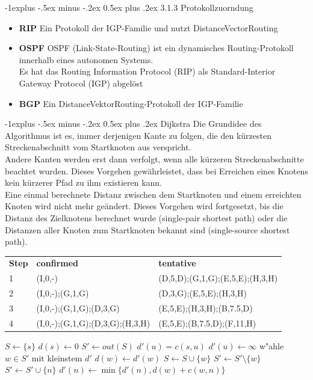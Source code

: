 \documentclass[10pt,landscape]{article}
\makeatletter
\renewcommand{\subsection}{\@startsection{subsection}{2}{0mm}%
                                {-1explus -.5ex minus -.2ex}%
                                {0.5ex plus .2ex}%
                                {\normalfont\normalsize\bfseries}}
\makeatother
\begin{document}
\begin{multicols}{3}
\subsection{3.1.3 Protokollzuorndung}
\begin{itemize}
    \item \textbf{RIP} Ein Protokoll der IGP-Familie und nutzt DistanceVectorRouting
    \item \textbf{OSPF} OSPF (Link-State-Routing) ist ein dynamisches Routing-Protokoll innerhalb eines autonomen Systems. \\
        Es hat das Routing Information Protocol (RIP) als Standard-Interior Gateway Protocol (IGP) abgel\"ost
    \item \textbf{BGP} Ein DistanceVektorRouting-Protokoll der IGP-Familie 
\end{itemize}


\subsection{Dijkstra}
Die Grundidee des Algorithmus ist es, immer derjenigen Kante zu folgen,
die den k\"urzesten Streckenabschnitt vom Startknoten aus verspricht. \\
Andere Kanten werden erst dann verfolgt, wenn alle k\"urzeren Streckenabschnitte beachtet wurden.
Dieses Vorgehen gew\"ahrleistet, dass bei Erreichen eines Knotens kein k\"urzerer Pfad zu ihm existieren kann. \\
Eine einmal berechnete Distanz zwischen dem Startknoten und einem erreichten Knoten wird nicht mehr ge\"andert.
Dieses Vorgehen wird fortgesetzt, bis die Distanz des Zielknotens berechnet wurde (single-pair shortest path)
oder die Distanzen aller Knoten zum Startknoten bekannt sind (single-source shortest path).
\tiny
\begin{tabular}{l|l|l}
\textbf{Step}   & \textbf{confirmed}    & \textbf{tentative} \\
1   & (I,0,-)           & (D,5,D);(G,1,G);(E,5,E);(H,3,H) \\
2   & (I,0,-);(G,1,G)   & (D,3,G);(E,5,E);(H,3,H) \\
3   & (I,0,-);(G,1,G);(D,3,G)   & (E,5,E);(H,3,H);(B,7.5,D) \\
4   & (I,0,-);(G,1,G);(D,3,G);(H,3,H)   & (E,5,E);(B,7.5,D);(F,11,H) \\
\end{tabular}
\begin{algorithmic}
	\STATE $S \gets \lbrace s \rbrace$
	\STATE $d(s) \gets 0$
  	\STATE $S' \gets  out(S)$
 		\STATE $d'(u) = c(s,u)$
 	\ENDFOR
 		\STATE $d'(u) \gets \infty$
  	\ENDFOR 
  		\STATE w"ahle $w \in S'$ mit kleinstem $d'$
  		\STATE $d(w) \gets d'(w)$
  		\STATE $S \gets S \cup \lbrace w \rbrace$
  		\STATE $S' \gets S' \setminus \lbrace w \rbrace$
  				\STATE $S' \gets S' \cup \lbrace n \rbrace$
  				\STATE $d'(n) \gets \min \lbrace d'(n), d(w) + c(w,n) \rbrace$
  			\ENDIF
  		\ENDFOR
  	\ENDWHILE 
\end{algorithmic}


\end{multicols}
\end{document}
